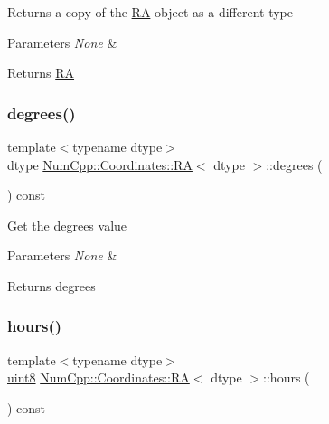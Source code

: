 Returns a copy of the \mbox{\hyperlink{class_num_cpp_1_1_coordinates_1_1_r_a}{RA}} object as a different type


\begin{DoxyParams}{Parameters}
{\em None} & \\
\hline
\end{DoxyParams}
\begin{DoxyReturn}{Returns}
\mbox{\hyperlink{class_num_cpp_1_1_coordinates_1_1_r_a}{RA}} 
\end{DoxyReturn}
\mbox{\label{class_num_cpp_1_1_coordinates_1_1_r_a_a748f19db6ece683524df75ccf71aac72}} 
\subsubsection{\texorpdfstring{degrees()}{degrees()}}
{\footnotesize\ttfamily template$<$typename dtype$>$ \\
dtype \mbox{\hyperlink{class_num_cpp_1_1_coordinates_1_1_r_a}{Num\+Cpp\+::\+Coordinates\+::\+RA}}$<$ dtype $>$\+::degrees (\begin{DoxyParamCaption}{ }\end{DoxyParamCaption}) const\hspace{0.3cm}{\ttfamily [inline]}}

Get the degrees value


\begin{DoxyParams}{Parameters}
{\em None} & \\
\hline
\end{DoxyParams}
\begin{DoxyReturn}{Returns}
degrees 
\end{DoxyReturn}
\mbox{\label{class_num_cpp_1_1_coordinates_1_1_r_a_a2435ddac71ce32ebe112a5a3d0438df7}} 
\subsubsection{\texorpdfstring{hours()}{hours()}}
{\footnotesize\ttfamily template$<$typename dtype$>$ \\
\mbox{\hyperlink{namespace_num_cpp_aee396d0469d6031cd18118c0a45bcdda}{uint8}} \mbox{\hyperlink{class_num_cpp_1_1_coordinates_1_1_r_a}{Num\+Cpp\+::\+Coordinates\+::\+RA}}$<$ dtype $>$\+::hours (\begin{DoxyParamCaption}{ }\end{DoxyParamCaption}) const\hspace{0.3cm}{\ttfamily [inline]}}

